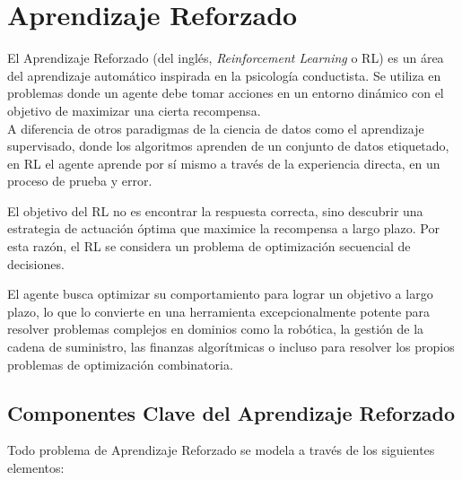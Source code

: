 \documentclass[12pt,a4paper]{book}
\begin{document}
\section{Aprendizaje Reforzado}

El Aprendizaje Reforzado \cite{intro_reforzado} (del inglés, \textit{Reinforcement Learning} o RL) es un área del aprendizaje automático inspirada en la psicología conductista. Se utiliza en problemas donde un agente debe tomar acciones en un entorno dinámico con el objetivo de maximizar una cierta recompensa.\\
A diferencia de otros paradigmas de la ciencia de datos como el aprendizaje supervisado, donde los algoritmos aprenden de un conjunto de datos etiquetado, en RL el agente aprende por sí mismo a través de la experiencia directa, en un proceso de prueba y error. 

El objetivo del RL no es encontrar la respuesta correcta, sino descubrir una estrategia de actuación óptima que maximice la recompensa a largo plazo. Por esta razón, el RL se considera un problema de optimización secuencial de decisiones.

El agente busca optimizar su comportamiento para lograr un objetivo a largo plazo, lo que lo convierte en una herramienta excepcionalmente potente para resolver problemas complejos en dominios como la robótica, la gestión de la cadena de suministro, las finanzas algorítmicas o incluso para resolver los propios problemas de optimización combinatoria.

\subsection{Componentes Clave del Aprendizaje Reforzado}

Todo problema de Aprendizaje Reforzado se modela a través de los siguientes elementos:
\end{document}
